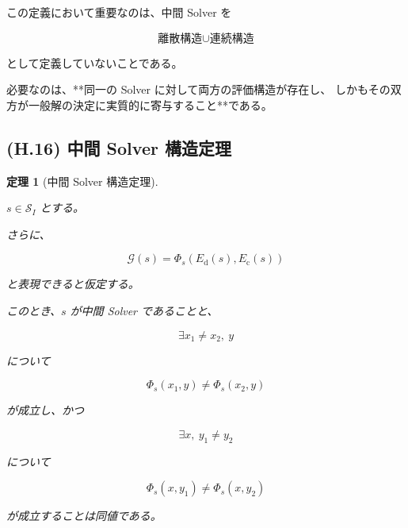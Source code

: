 \documentclass[a4paper,11pt]{article}
\newtheorem{theorem}[definition]{定理}
\begin{document}
この定義において重要なのは、中間 Solver を

\begin{equation}
    \text{離散構造}\cup\text{連続構造}
\end{equation}

として定義していないことである。

必要なのは、**同一の Solver に対して両方の評価構造が存在し、
しかもその双方が一般解の決定に実質的に寄与すること**である。


\subsection{(H.16) 中間 Solver 構造定理}
\label{subsec:H16}

\begin{theorem}[中間 Solver 構造定理]
\label{thm:H-middle-solver}

$s\in\mathcal{S}_I$ とする。

さらに、

\begin{equation}
    \mathcal{G}(s)
    =
    \Phi_s
    \left(
        E_{\mathrm d}(s),
        E_{\mathrm c}(s)
    \right)
\end{equation}

と表現できると仮定する。

このとき、$s$ が中間 Solver であることと、

\begin{equation}
    \exists x_1\neq x_2,\ y
\end{equation}

について

\begin{equation}
    \Phi_s(x_1,y)
    \neq
    \Phi_s(x_2,y)
    \label{eq:H-theorem-discrete}
\end{equation}

が成立し、かつ

\begin{equation}
    \exists x,\ y_1\neq y_2
\end{equation}

について

\begin{equation}
    \Phi_s(x,y_1)
    \neq
    \Phi_s(x,y_2)
    \label{eq:H-theorem-continuous}
\end{equation}

が成立することは同値である。
\end{theorem}
\end{document}
